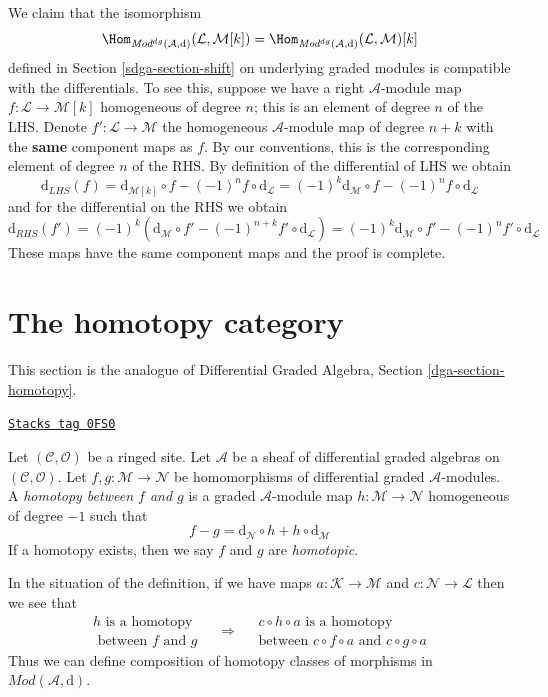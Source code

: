 \medskip\noindent
We claim that the isomorphism
$$
\Hom_{\textit{Mod}^{dg}(\mathcal{A}, \text{d})}(\mathcal{L}, \mathcal{M}[k])
=
\Hom_{\textit{Mod}^{dg}(\mathcal{A}, \text{d})}(\mathcal{L}, \mathcal{M})[k]
$$
defined in Section \ref{sdga-section-shift} on underlying graded modules
is compatible with
the differentials. To see this, suppose we have a right $\mathcal{A}$-module
map $f : \mathcal{L} \to \mathcal{M}[k]$ homogeneous of degree $n$; this
is an element of degree $n$ of the LHS. Denote
$f' : \mathcal{L} \to \mathcal{M}$ the homogeneous $\mathcal{A}$-module
map of degree $n + k$ with the {\bf same} component maps as $f$.
By our conventions, this is the corresponding element of degree $n$
of the RHS.
By definition of the differential of LHS we obtain
$$
\text{d}_{LHS}(f) =
\text{d}_{\mathcal{M}[k]} \circ f - (-1)^n f \circ \text{d}_\mathcal{L} =
(-1)^k\text{d}_\mathcal{M} \circ f - (-1)^n f \circ \text{d}_\mathcal{L}
$$
and for the differential on the RHS we obtain
$$
\text{d}_{RHS}(f') =
(-1)^k\left(
\text{d}_\mathcal{M} \circ f' - (-1)^{n + k} f' \circ \text{d}_\mathcal{L}
\right) =
(-1)^k\text{d}_\mathcal{M} \circ f' - (-1)^n f' \circ \text{d}_\mathcal{L}
$$
These maps have the same component maps and the proof is complete.

\section{The homotopy category}
\label{sdga-section-homotopy}
This section is the analogue of
Differential Graded Algebra, Section \ref{dga-section-homotopy}.

\begin{definition}[Homotopy]
\label{sdga-definition-homotopy}
\href{https://stacks.math.columbia.edu/tag/0FS0}{\texttt{Stacks tag 0FS0}}

Let $(\mathcal{C}, \mathcal{O})$ be a ringed site.
Let $\mathcal{A}$ be a sheaf of differential graded algebras
on $(\mathcal{C}, \mathcal{O})$. Let
$f, g : \mathcal{M} \to \mathcal{N}$
be homomorphisms of differential graded $\mathcal{A}$-modules.
A {\it homotopy between $f$ and $g$} is a graded $\mathcal{A}$-module
map $h : \mathcal{M} \to \mathcal{N}$ homogeneous of degree $-1$
such that
$$
f - g = \text{d}_\mathcal{N} \circ h + h \circ \text{d}_\mathcal{M}
$$
If a homotopy exists, then we say $f$ and $g$ are {\it homotopic}.
\end{definition}

In the situation of the definition, if we have maps
$a : \mathcal{K} \to \mathcal{M}$ and $c : \mathcal{N} \to \mathcal{L}$
then we see that
$$
\begin{matrix}
h\text{ is a homotopy} \\
\text{ between }f\text{ and } g
\end{matrix}
\quad
\Rightarrow
\quad
\begin{matrix}
c \circ h \circ a\text{ is a homotopy}\\
\text{between }
c \circ f \circ a\text{ and } c\circ g \circ a
\end{matrix}
$$
Thus we can define composition of homotopy classes of morphisms
in $\textit{Mod}(\mathcal{A}, \text{d})$.

